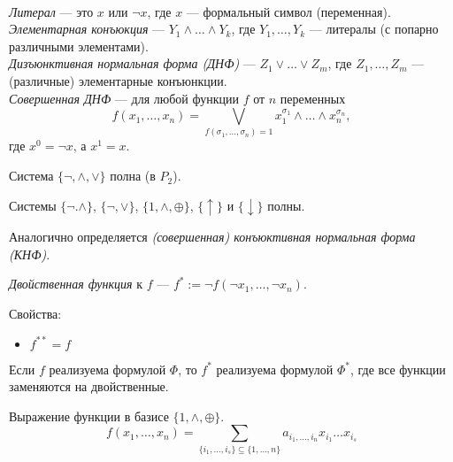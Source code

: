 \documentclass[12pt,a4paper]{article}
\begin{document}
    \begin{definition}\ \\
        \emph{Литерал} --- это $x$ или $\neg x$, где $x$ --- формальный символ (переменная).\\
        \emph{Элементарная конъюкция} --- $Y_1 \wedge \dots \wedge Y_k$, где $Y_1, \dots, Y_k$ --- литералы (с попарно различными элементами).\\
        \emph{Дизъюнктивная нормальная форма (ДНФ)} --- $Z_1 \vee \dots \vee Z_m$, где $Z_1, \dots, Z_m$ --- (различные) элементарные конъюнкции.\\
        \emph{Совершенная ДНФ} --- для любой функции $f$ от $n$ переменных \[f(x_1, \dots, x_n)=\bigvee_{f(\sigma_1, \dots, \sigma_n)=1} x_1^{\sigma_1} \wedge \dots \wedge x_n^{\sigma_n},\]
        где $x^0 = \neg x$, а $x^1 = x$.
    \end{definition}

    \begin{statement}
        Система $\{\neg, \wedge, \vee\}$ полна (в $P_2$).
    \end{statement}

    \begin{corollary}
        Системы $\{\neg. \wedge\}$, $\{\neg, \vee\}$, $\{1, \wedge, \oplus\}$, $\{\uparrow\}$ и $\{\downarrow\}$ полны.
    \end{corollary}

    \begin{definition}
        Аналогично определяется \emph{(совершенная) конъюктивная нормальная форма (КНФ)}.
    \end{definition}

    \begin{definition}
        \emph{Двойственная функция} к $f$ --- $f^* := \neg f(\neg x_1, \dots, \neg x_n)$.
    \end{definition}

    Свойства:
    \begin{itemize}
        \item $f^{**} = f$
    \end{itemize}

    \begin{statement}
        Если $f$ реализуема формулой $\Phi$, то $f^*$ реализуема формулой $\Phi^*$, где все функции заменяются на двойственные.
    \end{statement}

    \begin{definition}
        Выражение функции в базисе $\{1, \wedge, \oplus\}$.
        \[
            f(x_1, \dots, x_n) = \sum_{\{i_1, \dots, i_s\}\subseteq\{1, \dots, n\}} a_{i_1, \dots, i_n} x_{i_1} \dots x_{i_s}
        \]
    \end{definition}
\end{document}
